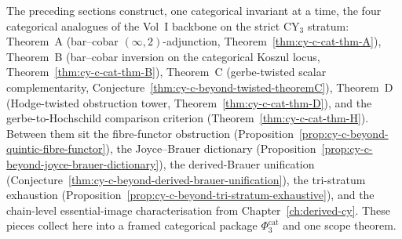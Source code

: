 The preceding sections construct, one categorical invariant at a time,
the four categorical analogues of the Vol~I backbone on the strict
CY$_3$ stratum: Theorem~A (bar--cobar $(\infty,2)$-adjunction,
Theorem~\ref{thm:cy-c-cat-thm-A}), Theorem~B (bar--cobar inversion on
the categorical Koszul locus, Theorem~\ref{thm:cy-c-cat-thm-B}),
Theorem~C (gerbe-twisted scalar complementarity,
Conjecture~\ref{thm:cy-c-beyond-twisted-theoremC}), Theorem~D
(Hodge-twisted obstruction tower, Theorem~\ref{thm:cy-c-cat-thm-D}),
and the gerbe-to-Hochschild comparison criterion
(Theorem~\ref{thm:cy-c-cat-thm-H}). Between them sit the fibre-functor
obstruction (Proposition~\ref{prop:cy-c-beyond-quintic-fibre-functor}),
the Joyce--Brauer dictionary
(Proposition~\ref{prop:cy-c-beyond-joyce-brauer-dictionary}), the
derived-Brauer unification
(Conjecture~\ref{thm:cy-c-beyond-derived-brauer-unification}), the
tri-stratum exhaustion
(Proposition~\ref{prop:cy-c-beyond-tri-stratum-exhaustive}), and the
chain-level essential-image characterisation from
Chapter~\ref{ch:derived-cy}. These pieces collect here into
a framed categorical package $\Phi_3^{\mathrm{cat}}$ and one scope theorem.


